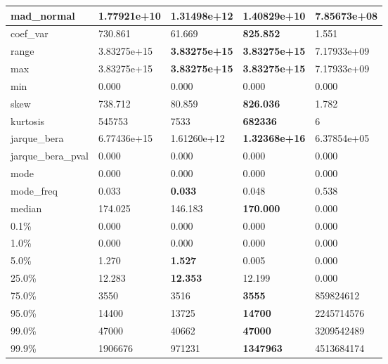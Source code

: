 \begin{table}[H]
\begin{tabular}{|l|m{10em}|m{10em}|m{10em}|m{10em}|}
\hline mad\_normal & 1.77921e+10 & \cellcolor[rgb]{0.9, 0.54, 0.52} 1.31498e+12 & \bfseries 1.40829e+10 & 7.85673e+08 \\
\hline coef\_var & 730.861 & 61.669 & \bfseries 825.852 & \cellcolor[rgb]{0.9, 0.54, 0.52} 1.551 \\
\hline range & 3.83275e+15 & \bfseries 3.83275e+15 & \bfseries 3.83275e+15 & \cellcolor[rgb]{0.9, 0.54, 0.52} 7.17933e+09 \\
\hline max & 3.83275e+15 & \bfseries 3.83275e+15 & \bfseries 3.83275e+15 & \cellcolor[rgb]{0.9, 0.54, 0.52} 7.17933e+09 \\
\hline min & 0.000 & 0.000 & 0.000 & 0.000 \\
\hline skew & 738.712 & 80.859 & \bfseries 826.036 & \cellcolor[rgb]{0.9, 0.54, 0.52} 1.782 \\
\hline kurtosis & 545753 & 7533 & \bfseries 682336 & \cellcolor[rgb]{0.9, 0.54, 0.52} 6 \\
\hline jarque\_bera & 6.77436e+15 & 1.61260e+12 & \bfseries 1.32368e+16 & \cellcolor[rgb]{0.9, 0.54, 0.52} 6.37854e+05 \\
\hline jarque\_bera\_pval & 0.000 & 0.000 & 0.000 & 0.000 \\
\hline mode & 0.000 & 0.000 & 0.000 & 0.000 \\
\hline mode\_freq & 0.033 & \bfseries 0.033 & 0.048 & \cellcolor[rgb]{0.9, 0.54, 0.52} 0.538 \\
\hline median & 174.025 & 146.183 & \bfseries 170.000 & \cellcolor[rgb]{0.9, 0.54, 0.52} 0.000 \\
\hline 0.1\% & 0.000 & 0.000 & 0.000 & 0.000 \\
\hline 1.0\% & 0.000 & 0.000 & 0.000 & 0.000 \\
\hline 5.0\% & 1.270 & \bfseries 1.527 & 0.005 & \cellcolor[rgb]{0.9, 0.54, 0.52} 0.000 \\
\hline 25.0\% & 12.283 & \bfseries 12.353 & 12.199 & \cellcolor[rgb]{0.9, 0.54, 0.52} 0.000 \\
\hline 75.0\% & 3550 & 3516 & \bfseries 3555 & \cellcolor[rgb]{0.9, 0.54, 0.52} 859824612 \\
\hline 95.0\% & 14400 & 13725 & \bfseries 14700 & \cellcolor[rgb]{0.9, 0.54, 0.52} 2245714576 \\
\hline 99.0\% & 47000 & 40662 & \bfseries 47000 & \cellcolor[rgb]{0.9, 0.54, 0.52} 3209542489 \\
\hline 99.9\% & 1906676 & 971231 & \bfseries 1347963 & \cellcolor[rgb]{0.9, 0.54, 0.52} 4513684174 \\
\hline
\end{tabular}
\end{table}
